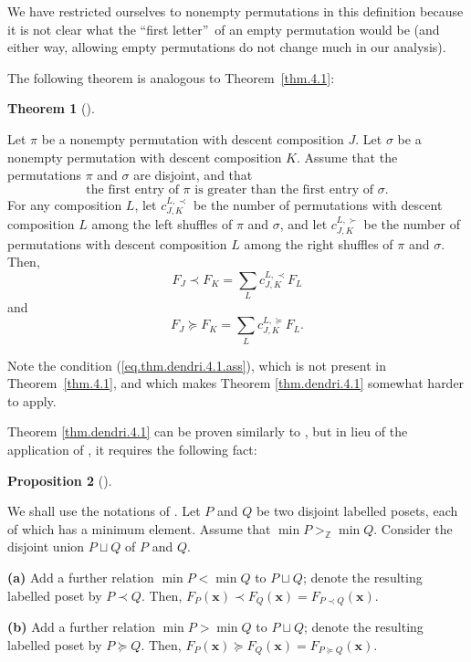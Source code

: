 \documentclass[numbers=enddot,12pt,final,onecolumn,notitlepage]{scrartcl}%
\theoremstyle{definition}
\newtheorem{theo}{Theorem}[section]
\newenvironment{theorem}[1][]
{\begin{theo}[#1]\begin{leftbar}}
{\end{leftbar}\end{theo}}
\newtheorem{prop}[theo]{Proposition}
\newenvironment{proposition}[1][]
{\begin{prop}[#1]\begin{leftbar}}
{\end{leftbar}\end{prop}}
\let\sumnonlimits\sum
\renewcommand{\sum}{\sumnonlimits\limits}
\begin{document}
We have restricted ourselves to nonempty permutations in this definition
because it is not clear what the \textquotedblleft first
letter\textquotedblright\ of an empty permutation would be (and either way,
allowing empty permutations do not change much in our analysis).

The following theorem is analogous to Theorem~\ref{thm.4.1}:

\begin{theorem}
\label{thm.dendri.4.1}Let $\pi$ be a nonempty permutation with descent
composition $J$. Let $\sigma$ be a nonempty permutation with descent
composition $K$. Assume that the permutations $\pi$ and $\sigma$ are disjoint,
and that%
\begin{equation}
\text{the first entry of }\pi\text{ is greater than the first entry of }%
\sigma\text{.} \label{eq.thm.dendri.4.1.ass}%
\end{equation}
For any composition $L$, let $c_{J,K}^{L,\prec}$ be the number of permutations
with descent composition $L$ among the left shuffles of $\pi$ and $\sigma$,
and let $c_{J,K}^{L,\succ}$ be the number of permutations with descent
composition $L$ among the right shuffles of $\pi$ and $\sigma$. Then,%
\[
F_{J}\left.  \prec\right.  F_{K}=\sum_{L}c_{J,K}^{L,\prec}F_{L}%
\]
and%
\[
F_{J}\left.  \succeq\right.  F_{K}=\sum_{L}c_{J,K}^{L,\succeq}F_{L}.
\]

\end{theorem}

Note the condition (\ref{eq.thm.dendri.4.1.ass}), which is not present in
Theorem~\ref{thm.4.1}, and which makes Theorem \ref{thm.dendri.4.1} somewhat
harder to apply.

Theorem \ref{thm.dendri.4.1} can be proven similarly to \cite[(5.2.6)]%
{HopfComb}, but in lieu of the application of \cite[Lemma 5.2.17]{HopfComb},
it requires the following fact:

\begin{proposition}
\label{prop.dendri.4.1.lem}We shall use the notations of \cite[Section
5.2]{HopfComb}. Let $P$ and $Q$ be two disjoint labelled posets, each of which
has a minimum element. Assume that $\min P>_{\mathbb{Z}}\min Q$. Consider the
disjoint union $P\sqcup Q$ of $P$ and $Q$.

\textbf{(a)} Add a further relation $\min P<\min Q$ to $P\sqcup Q$; denote the
resulting labelled poset by $P\left.  \prec\right.  Q$. Then, $F_{P}\left(
\mathbf{x}\right)  \left.  \prec\right.  F_{Q}\left(  \mathbf{x}\right)
=F_{P\left.  \prec\right.  Q}\left(  \mathbf{x}\right)  $.

\textbf{(b)} Add a further relation $\min P>\min Q$ to $P\sqcup Q$; denote the
resulting labelled poset by $P\left.  \succeq\right.  Q$. Then, $F_{P}\left(
\mathbf{x}\right)  \left.  \succeq\right.  F_{Q}\left(  \mathbf{x}\right)
=F_{P\left.  \succeq\right.  Q}\left(  \mathbf{x}\right)  $.
\end{proposition}
\end{document}
